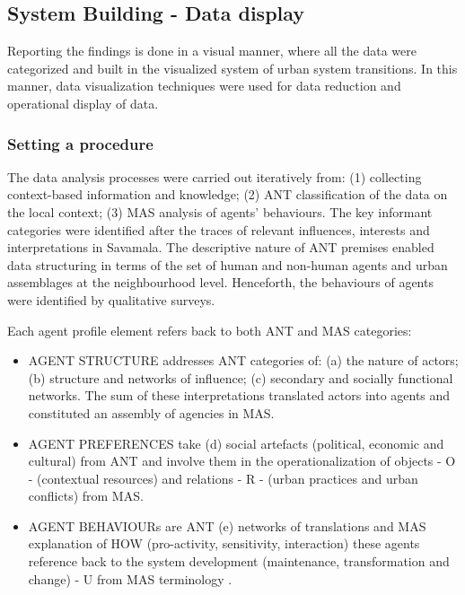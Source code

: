 \documentclass[11pt]{report}
\begin{document}
\subsection{System Building - Data display}

Reporting the findings is done in a visual manner, where all the data were categorized and built in the visualized system of urban system transitions. In this manner, data visualization techniques were used for data reduction and operational display of data.

\subsubsection{Setting a procedure}

The data analysis processes were carried out iteratively from: (1) collecting context-based information and knowledge; (2) ANT classification of the data on the local context; (3) MAS analysis of agents’ behaviours.
The key informant categories were identified after the traces of relevant influences, interests and interpretations in Savamala.
The descriptive nature of ANT premises enabled data structuring in terms of the set of human and non-human agents and urban assemblages at the neighbourhood level. Henceforth, the behaviours of agents were identified by qualitative surveys.

Each agent profile element refers back to both ANT and MAS categories:
\begin{itemize}
\item AGENT STRUCTURE addresses ANT categories of: (a) the nature of actors; (b) structure and networks of influence; (c) secondary and socially functional networks. The sum of these interpretations translated actors into agents and constituted an assembly of agencies  in MAS. 
\item AGENT PREFERENCES take (d) social artefacts (political, economic and cultural) from ANT and involve them in the operationalization of objects - O - (contextual resources) and relations - R - (urban practices and urban conflicts) from MAS.
\item AGENT BEHAVIOURs are ANT (e) networks of translations and MAS explanation of HOW (pro-activity, sensitivity, interaction) these agents reference back to the system development (maintenance, transformation and change) - U from MAS terminology .
\end{itemize}
\end{document}
